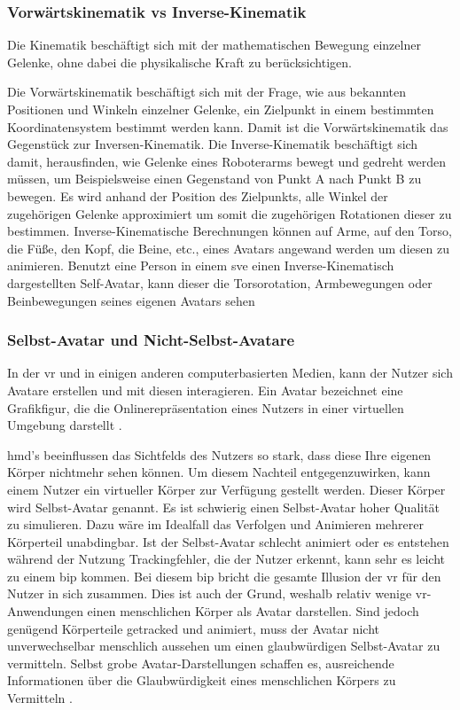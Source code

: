 \documentclass[a4paper,11pt]{article}%
\renewcommand{\\}{\vspace*{0.5\baselineskip} \newline}
\begin{document}
\subsubsection{Vorwärtskinematik vs Inverse-Kinematik}
Die Kinematik beschäftigt sich mit der mathematischen Bewegung einzelner Gelenke, ohne dabei die physikalische Kraft zu berücksichtigen. \citep[p.1]{beggs1983kinematics}

Die Vorwärtskinematik beschäftigt sich mit der Frage, wie aus bekannten Positionen und Winkeln einzelner Gelenke, ein Zielpunkt in einem bestimmten Koordinatensystem bestimmt werden kann. Damit ist die Vorwärtskinematik das Gegenstück zur Inversen-Kinematik. \citep[p.119]{kucuk2006robot}
\label{inverseKinematik}
Die Inverse-Kinematik beschäftigt sich damit, herausfinden, wie Gelenke eines Roboterarms bewegt und gedreht werden müssen, um Beispielsweise einen Gegenstand von Punkt A nach Punkt B zu bewegen. Es wird anhand der Position des Zielpunkts, alle Winkel der zugehörigen Gelenke approximiert um somit die zugehörigen Rotationen dieser zu bestimmen. \citep[p.299-300]{d2001learning} Inverse-Kinematische Berechnungen können auf Arme, auf den Torso, die Füße, den Kopf, die Beine, etc., eines Avatars angewand werden um diesen zu animieren. Benutzt eine Person in einem \ac{sve} einen Inverse-Kinematisch dargestellten Self-Avatar, kann dieser die Torsorotation, Armbewegungen oder Beinbewegungen seines eigenen Avatars sehen \citep[p.1]{kim2018real}

\subsubsection{Selbst-Avatar und Nicht-Selbst-Avatare}

In der \ac{vr} und in einigen anderen computerbasierten Medien, kann der Nutzer sich Avatare erstellen und mit diesen interagieren. Ein Avatar bezeichnet eine Grafikfigur, die die Onlinerepräsentation eines Nutzers in einer virtuellen Umgebung darstellt \citep[p.1]{neustaedter2009presenting}.

\ac{hmd}'s beeinflussen das Sichtfelds des Nutzers so stark, dass diese Ihre eigenen Körper nichtmehr sehen können. Um diesem Nachteil entgegenzuwirken, kann einem Nutzer ein virtueller Körper zur Verfügung gestellt werden. Dieser Körper wird Selbst-Avatar genannt.
Es ist schwierig einen Selbst-Avatar hoher Qualität zu simulieren. Dazu wäre im Idealfall das Verfolgen und Animieren mehrerer Körperteil unabdingbar. Ist der Selbst-Avatar schlecht animiert oder es entstehen während der Nutzung Trackingfehler, die der Nutzer erkennt, kann sehr es leicht zu einem \ac{bip} kommen. Bei diesem \ac{bip} bricht die gesamte Illusion der \ac{vr} für den Nutzer in sich zusammen. 
Dies ist auch der Grund, weshalb relativ wenige \ac{vr}-Anwendungen einen menschlichen Körper als Avatar darstellen.
Sind jedoch genügend Körperteile getracked und animiert, muss der Avatar nicht unverwechselbar menschlich aussehen um einen glaubwürdigen Selbst-Avatar zu vermitteln. Selbst grobe Avatar-Darstellungen schaffen es, ausreichende Informationen über die Glaubwürdigkeit eines menschlichen Körpers zu Vermitteln \citep{lok2003effects} .
\end{document}
